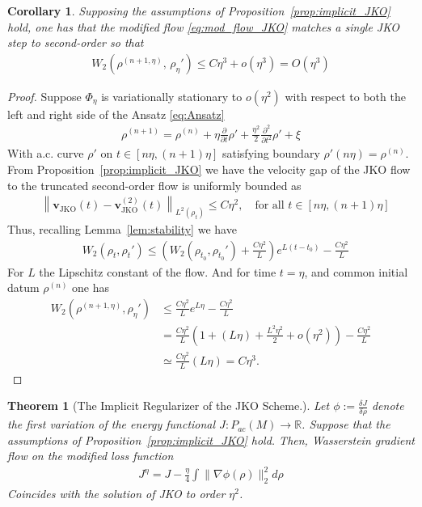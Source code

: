 \documentclass[reqno,11pt,letterpaper]{amsart}
\theoremstyle{plain}
\newtheorem{theorem}{Theorem}
\newtheorem{corollary}{Corollary}
\theoremstyle{definition}
\theoremstyle{remark}
\begin{document}
\begin{corollary}
    Supposing the assumptions of Proposition~\ref{prop:implicit_JKO} hold, one has that the modified flow \eqref{eq:mod_flow_JKO} matches a single JKO step to second-order so that
    \begin{align}
    W_{2} (\rho^{(n+1,\eta)}, \,\rho_{\eta}') \leq C\eta^{3} + o(\eta^{3}) = O(\eta^{3})
    \end{align}
\end{corollary}

\begin{proof}
    Suppose $\Phi_{\eta}$ is variationally stationary to $o(\eta^{2})$ with respect to both the left and right side of the Ansatz \eqref{eq:Ansatz}
    \begin{align}\label{eq:Ansatz}
    \rho^{(n+1)} = \rho^{(n)} + \eta \frac{\partial }{\partial t}\rho' + \frac{\eta^{2}}{2} \frac{\partial^{2} }{\partial t^{2}} \rho' + \xi
    \end{align}
    With a.c. curve $\rho'$ on $t \in [n\eta, (n+1)\eta]$ satisfying boundary $\rho'(n\eta) = \rho^{(n)}$. From Proposition~\ref{prop:implicit_JKO} we have the velocity gap of the JKO flow to the truncated second-order flow is uniformly bounded as
    \begin{align*}
    &\left\lVert \bm{v}_{\mathrm{JKO}}(t) - \bm{v}_{\mathrm{JKO}}^{(2)}(t) \right\rVert_{L^{2}(\rho_{t})}\leq C \eta^{2}, \quad \text{for all }t\in [n\eta, (n+1)\eta]
    \end{align*}
    Thus, recalling Lemma~\ref{lem:stability} we have
    \begin{align*}
    &W_{2} (\rho_{t}, \rho_{t}') \leq \left( W_{2} (\rho_{t_0}, \rho_{t_0}' )  + \frac{C\eta^{2}}{L} \right) e^{L(t-t_{0})} - \frac{C\eta^{2}}{L}
\end{align*}
For $L$ the Lipschitz constant of the flow. And for time $t=\eta$, and common initial datum $\rho^{(n)}$ one has
 \begin{align*}
    W_{2} (\rho^{(n+1,\eta)}, \rho_{\eta}') &\leq \frac{C\eta^{2}}{L}  e^{L\eta} - \frac{C\eta^{2}}{L} \\
    &= 
\frac{C\eta^{2}}{L}\left(1 + (L\eta) + \frac{L^{2}\eta^{2}}{2} + o(\eta^{2})
\right) - \frac{C\eta^{2}}{L} \\
&\simeq \frac{C\eta^{2}}{L}(L\eta) =C\eta^{3}.
\end{align*}
\end{proof}

\begin{theorem}[The Implicit Regularizer of the JKO Scheme.]\label{thrm:velocity_to_loss} Let $\phi := \frac{\delta J}{\delta \rho}$ denote the first variation of the energy functional $J: {P}_{ac}(M) \to \mathbb{R}$. Suppose that the assumptions of Proposition~\ref{prop:implicit_JKO} hold. Then, Wasserstein gradient flow on the modified loss function
\begin{align}\label{eq:JKO_mod_loss}
J^{\eta} = J -
    \frac{\eta}{4} \int \lVert \nabla \phi(\rho) \rVert_{2}^{2} d \rho
\end{align}
Coincides with the solution of JKO to order $\eta^{2}$.
\end{theorem}
\end{document}
